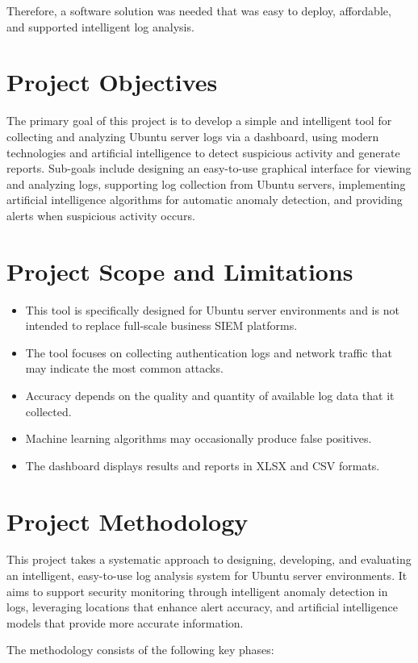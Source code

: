 \documentclass[12pt,a4paper]{report} %
\begin{document}
Therefore, a software solution was needed that was easy to deploy, affordable, and supported intelligent log analysis.

\section{Project Objectives}
The primary goal of this project is to develop a simple and intelligent tool for collecting and analyzing Ubuntu server logs via a dashboard, using modern technologies and artificial intelligence to detect suspicious activity and generate reports. Sub-goals include designing an easy-to-use graphical interface for viewing and analyzing logs, supporting log collection from Ubuntu servers, implementing artificial intelligence algorithms for automatic anomaly detection, and providing alerts when suspicious activity occurs.


\section{Project Scope and Limitations}
\begin{itemize}[leftmargin=*]
   \item This tool is specifically designed for Ubuntu server environments and is not intended to replace full-scale business SIEM platforms.
   \item The tool focuses on collecting authentication logs and network traffic that may indicate the most common attacks.
   \item Accuracy depends on the quality and quantity of available log data that it collected.
   \item Machine learning algorithms may occasionally produce false positives.
   \item The dashboard displays results and reports in XLSX and CSV formats.
\end{itemize}
\section{Project Methodology}
This project takes a systematic approach to designing, developing, and evaluating an intelligent, easy-to-use log analysis system for Ubuntu server environments. It aims to support security monitoring through intelligent anomaly detection in logs, leveraging locations that enhance alert accuracy, and artificial intelligence models that provide more accurate information.

The methodology consists of the following key phases:
\end{document}
